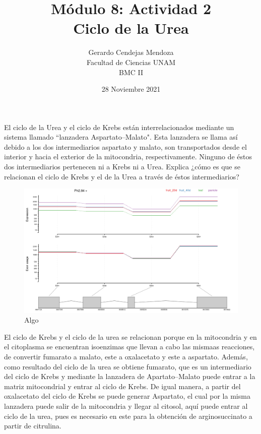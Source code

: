 \documentclass[12pt]{article}
\begin{document}
	
	\title {Módulo 8: Actividad 2\\Ciclo de la Urea}
	\date{28 Noviembre 2021}
	\author{Gerardo Cendejas Mendoza\\ Facultad de Ciencias UNAM\\BMC II}
	
	\maketitle
	
	El ciclo de la Urea y el ciclo de Krebs están interrelacionados mediante un sistema llamado ``lanzadera Aspartato--Malato". Esta lanzadera se llama así debido a los dos intermediarios aspartato y malato, son transportados desde el interior y hacia el exterior de la mitocondria, respectivamente. Ninguno de éstos dos intermediarios pertenecen ni a Krebs ni a Urea. Explica ¿cómo es que se relacionan el ciclo de Krebs y el de la Urea a través de éstos intermediarios?
	
	\FloatBarrier
	\begin{figure}[h]
		\centering
		\includegraphics[scale=0.3]{../2/Transcripts/6.png}
		\caption{Algo}
	\end{figure}
	\FloatBarrier
	
	\newpage
	
	El ciclo de Krebs y el ciclo de la urea se relacionan porque en la mitocondria y en el citoplasma se encuentran isoenzimas que llevan a cabo las mismaas reacciones, de convertir fumarato a malato, este a oxalacetato y este a aspartato. Además, como resultado del ciclo de la urea se obtiene fumarato, que es un intermediario del ciclo de Krebs y mediante la lanzadera de Apartato--Malato puede entrar a la matriz mitocondrial y entrar al ciclo de Krebs. De igual manera, a partir del oxalacetato del ciclo de Krebs se puede generar Aspartato, el cual por la misma lanzadera puede salir de la mitocondria y llegar al citosol, aquí puede entrar al ciclo de la urea, pues es necesario en este para la obtención de arginosuccinato a partir de citrulina.
	\newline
	
	
	
	
	
\end{document}
